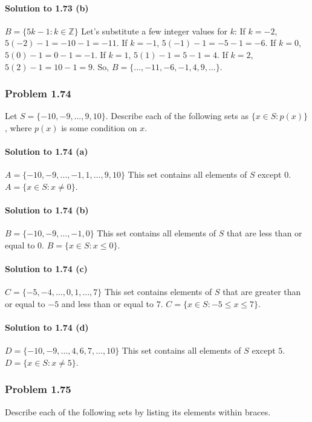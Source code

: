 \documentclass{article}
\begin{document}
\paragraph*{Solution to 1.73 (b)}
$B = \{5k - 1 : k \in \mathbb{Z}\}$
Let's substitute a few integer values for $k$:
If $k = -2$, $5(-2) - 1 = -10 - 1 = -11$.
If $k = -1$, $5(-1) - 1 = -5 - 1 = -6$.
If $k = 0$, $5(0) - 1 = 0 - 1 = -1$.
If $k = 1$, $5(1) - 1 = 5 - 1 = 4$.
If $k = 2$, $5(2) - 1 = 10 - 1 = 9$.
So, $B = \{\dots, -11, -6, -1, 4, 9, \dots\}$.

\subsubsection*{Problem 1.74}
Let $S = \{-10, -9, \dots, 9, 10\}$. Describe each of the following sets as $\{x \in S : p(x)\}$, where $p(x)$ is some condition on $x$.

\paragraph*{Solution to 1.74 (a)}
$A = \{-10, -9, \dots, -1, 1, \dots, 9, 10\}$
This set contains all elements of $S$ except $0$.
$A = \{x \in S : x \neq 0\}$.

\paragraph*{Solution to 1.74 (b)}
$B = \{-10, -9, \dots, -1, 0\}$
This set contains all elements of $S$ that are less than or equal to $0$.
$B = \{x \in S : x \le 0\}$.

\paragraph*{Solution to 1.74 (c)}
$C = \{-5, -4, \dots, 0, 1, \dots, 7\}$
This set contains elements of $S$ that are greater than or equal to $-5$ and less than or equal to $7$.
$C = \{x \in S : -5 \le x \le 7\}$.

\paragraph*{Solution to 1.74 (d)}
$D = \{-10, -9, \dots, 4, 6, 7, \dots, 10\}$
This set contains all elements of $S$ except $5$.
$D = \{x \in S : x \neq 5\}$.

\subsubsection*{Problem 1.75}
Describe each of the following sets by listing its elements within braces.
\end{document}
